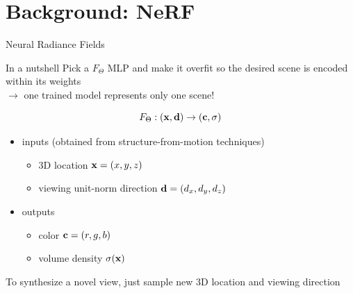 \documentclass[aspectratio=1610]{beamer}
\begin{document}
\section{Background: NeRF}
\begin{frame}{Neural Radiance Fields}
    \begin{block}{In a nutshell}
        Pick a \(F_\Theta\) MLP and make it overfit so the desired scene is encoded within its weights\\\(\rightarrow\) one trained model represents only one scene!
    \end{block}
    \begin{equation*}
        F_\Theta : (\vb{x}, \vb{d}) \rightarrow (\vb{c}, \sigma)
    \end{equation*}
    \begin{itemize}
        \item inputs (obtained from structure-from-motion techniques)
        \begin{itemize}
            \item 3D location \(\vb{x} = (x, y, z)\)
            \item viewing unit-norm direction \(\vb{d} = (d_x, d_y, d_z)\) 
        \end{itemize} 
        \item outputs
        \begin{itemize}
            \item color \(\vb{c} = (r, g, b)\)
            \item volume density \(\sigma(\vb{x})\) 
        \end{itemize}
    \end{itemize}

    To synthesize a novel view, just sample new 3D location and viewing direction
\end{frame}
\end{document}
